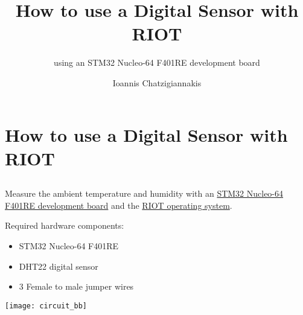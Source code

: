\documentclass[aspectratio=169]{beamer}
\title[Lecture 1]{How to use a Digital Sensor with RIOT}
\subtitle{using an STM32 Nucleo-64 F401RE development board}
\author[I.Chatzigiannakis]{Ioannis Chatzigiannakis}
\institute{\url{https://github.com/ichatz/riotos-apps}}
\date{}
\begin{document}
{

\frame{\titlepage}

}

\section{How to use a Digital Sensor with RIOT}

\subsection{}

\begin{frame}{}

\begin{block}{}
Measure the ambient temperature and humidity with an \href{https://www.st.com/en/evaluation-tools/nucleo-f401re.html}{STM32 Nucleo-64 F401RE development board} and the \href{https://github.com/RIOT-OS/RIOT}{RIOT operating system}.
\end{block}

\bigskip

Required hardware components:

\begin{itemize}
	
\item<1-> STM32 Nucleo-64 F401RE

\item<2-> DHT22 digital sensor

\item<3> 3 Female to male jumper wires

\end{itemize}
\end{frame}



\begin{frame}{}
\vspace{.2cm}
\hspace*{1cm}
\texttt{[image: circuit\_bb]}
\end{frame}
\end{document}
